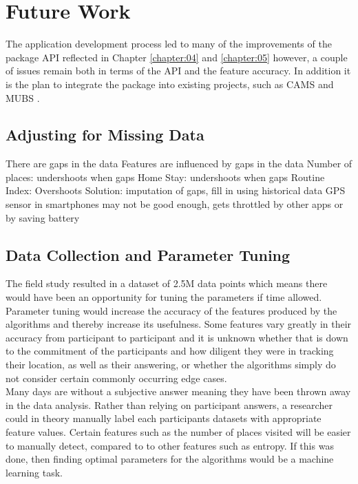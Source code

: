 \clearpage
\section{Future Work}
The application development process led to many of the improvements of the package API reflected in Chapter \ref{chapter:04} and \ref{chapter:05} however, a couple of issues remain both in terms of the API and the feature accuracy. In addition it is the plan to integrate the package into existing projects, such as CAMS \cite{CAMS} and MUBS \cite{mubs-rohani}.

\subsection{Adjusting for Missing Data}
There are gaps in the data
Features are influenced by gaps in the data
Number of places: undershoots when gaps
Home Stay: undershoots when gaps
Routine Index: Overshoots
Solution: imputation of gaps, fill in using historical data
GPS sensor in smartphones may not be good enough, gets throttled by other apps or by saving battery

\subsection{Data Collection and Parameter Tuning}
The field study resulted in a dataset of 2.5M data points which means there would have been an opportunity for tuning the parameters if time allowed. Parameter tuning would increase the accuracy of the features produced by the algorithms and thereby increase its usefulness. Some features vary greatly in their accuracy from participant to participant and it is unknown whether that is down to the commitment of the participants and how diligent they were in tracking their location, as well as their answering, or whether the algorithms simply do not consider certain commonly occurring edge cases.\\

Many days are without a subjective answer meaning they have been thrown away in the data analysis. Rather than relying on participant answers, a researcher could in theory manually label each participants datasets with appropriate feature values. Certain features such as the number of places visited will be easier to manually detect, compared to to other features such as entropy. If this was done, then finding optimal parameters for the algorithms would be a machine learning task. \\

